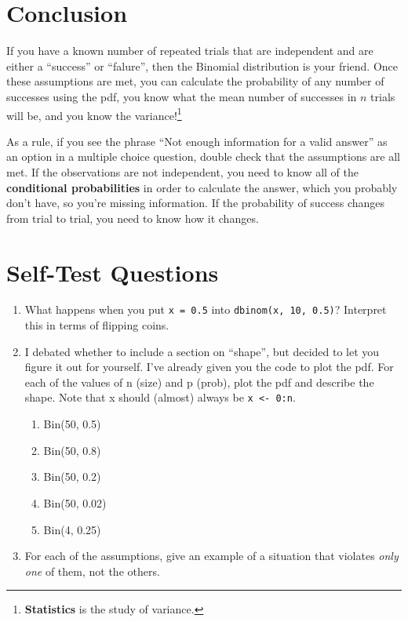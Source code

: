 \documentclass[
  letterpaper,
  DIV=11,
  numbers=noendperiod]{scrreprt}
\providecommand{\tightlist}{%
  \setlength{\itemsep}{0pt}\setlength{\parskip}{0pt}}\usepackage{longtable,booktabs,array}
\begin{document}
\hypertarget{conclusion}{%
\chapter{Conclusion}\label{conclusion}}

If you have a known number of repeated trials that are independent and
are either a ``success'' or ``falure'', then the Binomial distribution
is your friend. Once these assumptions are met, you can calculate the
probability of any number of successes using the pdf, you know what the
mean number of successes in \(n\) trials will be, and you know the
variance!\footnote{\textbf{Statistics} is the study of variance.}

As a rule, if you see the phrase ``Not enough information for a valid
answer'' as an option in a multiple choice question, double check that
the assumptions are all met. If the observations are not independent,
you need to know all of the \textbf{conditional probabilities} in order
to calculate the answer, which you probably don't have, so you're
missing information. If the probability of success changes from trial to
trial, you need to know how it changes.

\hypertarget{self-test-questions}{%
\chapter{Self-Test Questions}\label{self-test-questions}}

\begin{enumerate}
\def\labelenumi{\arabic{enumi}.}
\tightlist
\item
  What happens when you put \texttt{x\ =\ 0.5} into
  \texttt{dbinom(x,\ 10,\ 0.5)}? Interpret this in terms of flipping
  coins.
\item
  I debated whether to include a section on ``shape'', but decided to
  let you figure it out for yourself. I've already given you the code to
  plot the pdf. For each of the values of n (size) and p (prob), plot
  the pdf and describe the shape. Note that x should (almost) always be
  \texttt{x\ \textless{}-\ 0:n}.

  \begin{enumerate}
  \def\labelenumii{\alph{enumii})}
  \tightlist
  \item
    Bin(50, 0.5)
  \item
    Bin(50, 0.8)
  \item
    Bin(50, 0.2)
  \item
    Bin(50, 0.02)
  \item
    Bin(4, 0.25)
  \end{enumerate}
\item
  For each of the assumptions, give an example of a situation that
  violates \emph{only one} of them, not the others.
\end{enumerate}
\end{document}
